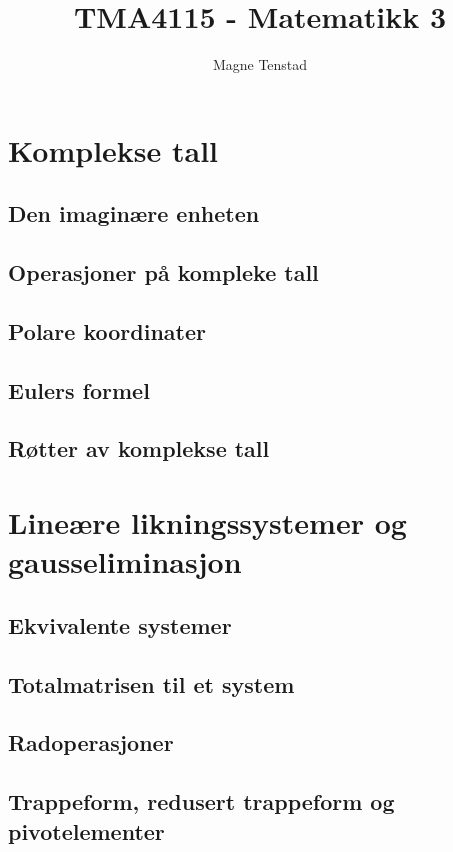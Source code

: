 \documentclass{article}
\title{TMA4115 - Matematikk 3}
\author{Magne Tenstad}
\begin{document}
\maketitle

\clearpage

\tableofcontents

\clearpage



\section{Komplekse tall}

\subsection{Den imaginære enheten}
\subsection{Operasjoner på kompleke tall}
\subsection{Polare koordinater}
\subsection{Eulers formel}
\subsection{Røtter av komplekse tall}


\section{Lineære likningssystemer og gausseliminasjon}

\subsection{Ekvivalente systemer}
\subsection{Totalmatrisen til et system}
\subsection{Radoperasjoner}
\subsection{Trappeform, redusert trappeform og pivotelementer}
\end{document}
